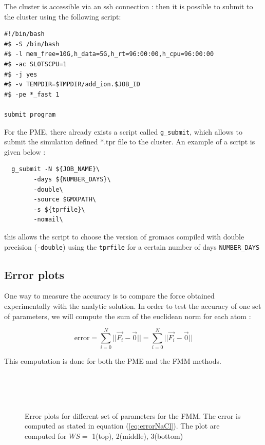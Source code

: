 \documentclass[11pt,twoside,a4paper]{report}
\begin{document}
The cluster is accessible via an ssh connection : then it is possible to submit to the cluster using the following script:


\begin{verbatim}
#!/bin/bash
#$ -S /bin/bash
#$ -l mem_free=10G,h_data=5G,h_rt=96:00:00,h_cpu=96:00:00
#$ -ac SLOTSCPU=1
#$ -j yes
#$ -v TEMPDIR=$TMPDIR/add_ion.$JOB_ID
#$ -pe *_fast 1

submit program 

\end{verbatim}

For the PME, there already exists a script called \texttt{g\_submit}, which allows to submit the simulation defined *.tpr file to the cluster. An example of a script is given below :

\begin{verbatim}
  g_submit -N ${JOB_NAME}\
	    -days ${NUMBER_DAYS}\
	    -double\
	    -source $GMXPATH\
	    -s ${tprfile}\
	    -nomail\
\end{verbatim}

this allows the script to choose the version of gromacs compiled with double precision (\texttt{-double}) using the \texttt{tprfile} for a certain number of days \texttt{NUMBER\_DAYS}



\subsection{Error plots}

One way to measure the accuracy is to compare the force obtained experimentally with the analytic solution. In order to test the accuracy of one set of parameters, we will compute the sum of the euclidean norm for each atom :

\begin{equation}
	\label{eq:errorNaCl}
	\text{error} = \sum\limits_{i=0}^N ||\vec{F_i} - \vec{0}|| = \sum\limits_{i=0}^N ||\vec{F_i} - \vec{0}||
\end{equation}

 
	This computation is done for both the PME and the FMM methods.\\
	
	    \begin{figure}[H]
 
    \centering  
 \\    
  \\   
\\    
     \caption{Error plots for different set of parameters for the FMM. The error is computed as stated in equation (\ref{eq:errorNaCl}). The plot are computed for $WS =$ 1(top), 2(middle), 3(bottom)} 
      
   \end{figure}  
   
\end{document}

